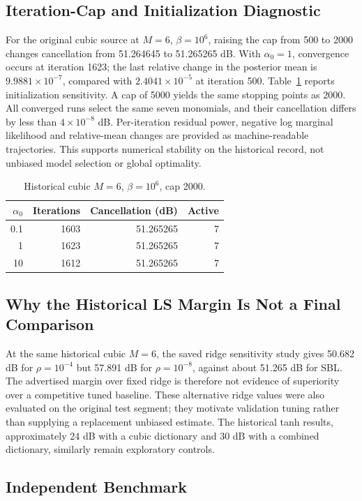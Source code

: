\documentclass[conference]{IEEEtran}
\begin{document}
\subsection{Iteration-Cap and Initialization Diagnostic}
For the original cubic source at $M=6$, $\beta=10^6$, raising the cap from 500 to 2000 changes cancellation from 51.264645 to 51.265265 dB. With $\alpha_0=1$, convergence occurs at iteration 1623; the last relative change in the posterior mean is $9.9881\times10^{-7}$, compared with $2.4041\times10^{-5}$ at iteration 500. Table~\ref{tab:convergence} reports initialization sensitivity. A cap of 5000 yields the same stopping points as 2000. All converged runs select the same seven monomials, and their cancellation differs by less than $4\times10^{-8}$ dB. Per-iteration residual power, negative log marginal likelihood and relative-mean changes are provided as machine-readable trajectories. This supports numerical stability on the historical record, not unbiased model selection or global optimality.
\begin{table}[!t]
\caption{Historical cubic $M=6$, $\beta=10^6$, cap 2000.}\label{tab:convergence}
\centering\small
\begin{tabular}{rrrr}\toprule
$\alpha_0$ & Iterations & Cancellation (dB) & Active\\\midrule
0.1 & 1603 & 51.265265 & 7\\
1 & 1623 & 51.265265 & 7\\
10 & 1612 & 51.265265 & 7\\\bottomrule
\end{tabular}
\end{table}

\subsection{Why the Historical LS Margin Is Not a Final Comparison}
At the same historical cubic $M=6$, the saved ridge sensitivity study gives 50.682 dB for $\rho=10^{-4}$ but 57.891 dB for $\rho=10^{-8}$, against about 51.265 dB for SBL. The advertised margin over fixed ridge is therefore not evidence of superiority over a competitive tuned baseline. These alternative ridge values were also evaluated on the original test segment; they motivate validation tuning rather than supplying a replacement unbiased estimate. The historical tanh results, approximately 24 dB with a cubic dictionary and 30 dB with a combined dictionary, similarly remain exploratory controls.

\subsection{Independent Benchmark}
\end{document}
